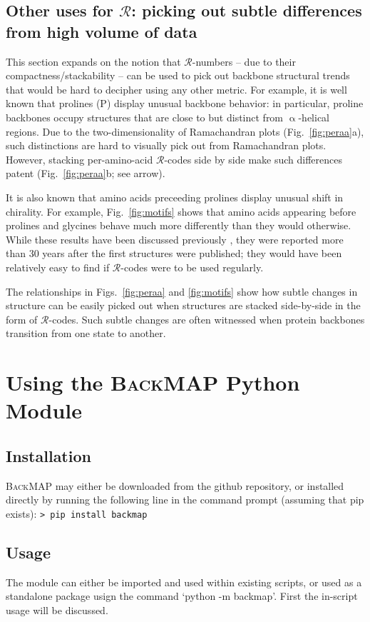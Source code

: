 \documentclass[fleqn,10pt,lineno]{wlpeerj} %
\newcommand{\Fig}[1]{Fig.~\ref{#1}}
\newcommand{\Figs}[1]{Figs.~\ref{#1}}
\newcommand{\gname}{BackMAP}
\newcommand{\pname}{\textsc{\gname}\xspace}
\newcommand{\code}[1]{\texttt{#1}\xspace}
\newcommand{\rr}{$\mathcal{R}$\xspace}
\begin{document}
\subsection*{Other uses for \rr: picking out subtle differences from high volume of data}

This section expands on the notion that \rr-numbers -- due to their compactness/stackability -- can be used to pick out backbone structural trends that would be hard to decipher using any other metric. For example, it is well known that prolines (P) display unusual backbone behavior: in particular, proline backbones occupy structures that are close to but distinct from $\upalpha$-helical regions. Due to the two-dimensionality of Ramachandran plots (\Fig{fig:peraa}a), such distinctions are hard to visually pick out from Ramachandran plots. However, stacking per-amino-acid \rr-codes side by side make such differences patent (\Fig{fig:peraa}b; see arrow).

It is also known that amino acids preceeding prolines display unusual shift in chirality. For example, \Fig{fig:motifs} shows that amino acids appearing before prolines and glycines behave much more differently than they would otherwise. While these results have been discussed previously \citep{Gunasekaran1998,Ho2005}, they were reported more than 30 years after the first structures were published; they would have been relatively easy to find if \rr-codes were to be used regularly. 

The relationships in \Figs{fig:peraa} and \ref{fig:motifs} show how subtle changes in structure can be easily picked out when structures are stacked side-by-side in the form of $\mathcal{R}$-codes. Such subtle changes are often witnessed when protein backbones transition from one state to another.

\section*{Using the \pname Python Module}

\subsection*{Installation}
\pname may either be downloaded from the github repository, or installed directly by running the following line in the command prompt (assuming that pip exists): \code{> pip install backmap}

\subsection*{Usage}
The module can either be imported and used within existing scripts, or used as a standalone package usign the command `python -m backmap'. First the in-script usage will be discussed.
\end{document}
